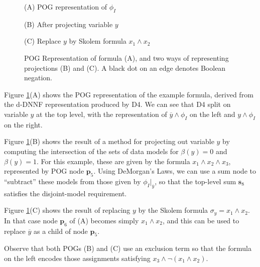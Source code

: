 \documentclass[letterpaper,USenglish,cleveref, autoref, thm-restate]{lipics-v2021}
\newcommand{\obar}[1]{\overline{#1}}
\newcommand{\aassign}{\beta}
\newcommand{\skolem}{\sigma}
\newcommand{\inputformula}{\phi_I}
\newcommand{\makenode}[1]{\mathbf{#1}}
\newcommand{\nodes}{\makenode{s}}
\newcommand{\nodep}{\makenode{p}}
\newcommand{\simplify}[2]{#1|_{#2}}
\newcommand{\progname}[1]{\textsc{#1}}
\newcommand{\dfour}{\progname{D4}}
\begin{document}
\begin{figure}
  \begin{minipage}{0.48\textwidth}
    (A) POG representation of $\inputformula$ \\[1.2ex]
    
  \end{minipage}
  \begin{minipage}{0.48\textwidth}
  \end{minipage}

  \begin{minipage}{0.48\textwidth}
    (B) After projecting variable $y$ \\[1.2ex]
    
  \end{minipage}
  \begin{minipage}{0.48\textwidth}
    (C) Replace $y$ by Skolem formula $x_1 \land x_2$ \\[1.2ex]
    
  \end{minipage}
  \caption{POG Representation of formula (A), and two ways of representing projections (B) and (C).
  A black dot on an edge denotes Boolean negation.}
  \label{fig:eg-proj}
\end{figure}

Figure \ref{fig:eg-proj}(A) shows the POG representation of the
example formula, derived from the d-DNNF representation produced by
\dfour{}.  We can see that \dfour{} split on variable $y$ at the top level, with the representation of
$\obar{y} \land \inputformula$ on the left and 
$y \land \inputformula$ on the right.

Figure \ref{fig:eg-proj}(B) shows the result of a method for projecting out variable
$y$ by computing the intersection of the sets of data models for
$\aassign(y) = 0$ and $\aassign(y) = 1$.  For this example, these are
given by the formula $x_1 \land x_2 \land x_3$, represented by POG
node $\nodep_5$.  Using DeMorgan's Laws, we can use a sum node to
``subtract'' these models from those given by
$\simplify{\inputformula}{\obar{y}}$, so that the top-level sum
$\nodes_8$ satisfies the disjoint-model requirement.

Figure \ref{fig:eg-proj}(C) shows the result of replacing $y$ by the
Skolem formula
$\skolem_y = x_1 \land x_2$.  In that case node
$\nodep_6$ of (A) becomes simply $x_1 \land x_2$, and this can be used
to replace $\obar{y}$ as a child of node $\nodep_5$.

Observe that both POGs (B) and (C) use an exclusion term so that the formula
on the left encodes those assignments satisfying $x_3 \land \neg (x_1 \land x_2)$.
\end{document}
